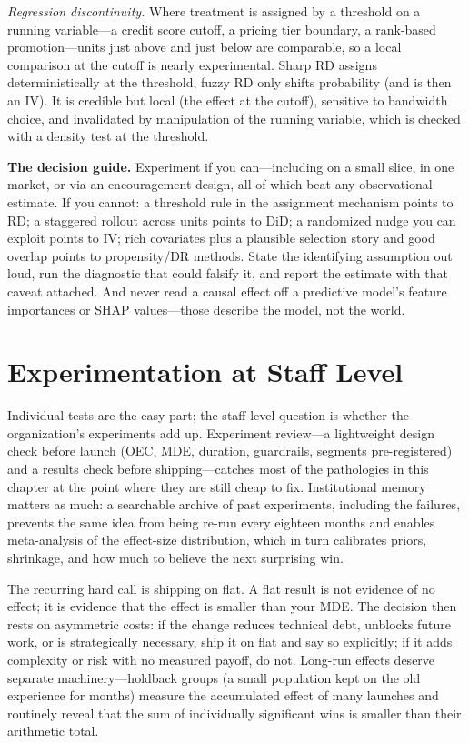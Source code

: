 \emph{Regression discontinuity.} Where treatment is assigned by a threshold on a running variable---a credit score cutoff, a pricing tier boundary, a rank-based promotion---units just above and just below are comparable, so a local comparison at the cutoff is nearly experimental. Sharp RD assigns deterministically at the threshold, fuzzy RD only shifts probability (and is then an IV). It is credible but local (the effect at the cutoff), sensitive to bandwidth choice, and invalidated by manipulation of the running variable, which is checked with a density test at the threshold.

\begin{warningbox}
\textbf{The decision guide.} Experiment if you can---including on a small slice, in one market, or via an encouragement design, all of which beat any observational estimate. If you cannot: a threshold rule in the assignment mechanism points to RD; a staggered rollout across units points to DiD; a randomized nudge you can exploit points to IV; rich covariates plus a plausible selection story and good overlap points to propensity/DR methods. State the identifying assumption out loud, run the diagnostic that could falsify it, and report the estimate with that caveat attached. And never read a causal effect off a predictive model's feature importances or SHAP values---those describe the model, not the world.
\end{warningbox}

\section{Experimentation at Staff Level}
\label{cml:sec:culture}

Individual tests are the easy part; the staff-level question is whether the organization's experiments add up. Experiment review---a lightweight design check before launch (OEC, MDE, duration, guardrails, segments pre-registered) and a results check before shipping---catches most of the pathologies in this chapter at the point where they are still cheap to fix. Institutional memory matters as much: a searchable archive of past experiments, including the failures, prevents the same idea from being re-run every eighteen months and enables meta-analysis of the effect-size distribution, which in turn calibrates priors, shrinkage, and how much to believe the next surprising win.

The recurring hard call is shipping on flat. A flat result is not evidence of no effect; it is evidence that the effect is smaller than your MDE. The decision then rests on asymmetric costs: if the change reduces technical debt, unblocks future work, or is strategically necessary, ship it on flat and say so explicitly; if it adds complexity or risk with no measured payoff, do not. Long-run effects deserve separate machinery---holdback groups (a small population kept on the old experience for months) measure the accumulated effect of many launches and routinely reveal that the sum of individually significant wins is smaller than their arithmetic total.

